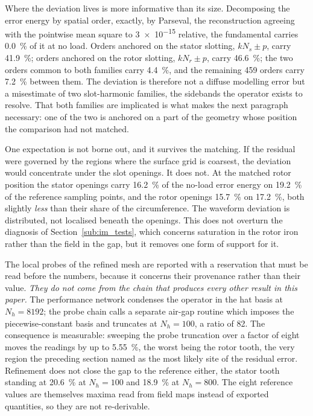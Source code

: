\documentclass[10pt,a4paper,twocolumn]{article}
\theoremstyle{plain}
\theoremstyle{remark}
\begin{document}
Where the deviation lives is more informative than its size. Decomposing
the error energy by spatial order, exactly, by Parseval, the
reconstruction agreeing with the pointwise mean square to \num{3e-15}
relative, the fundamental carries \SI{0.0}{\percent} of it at no load.
Orders anchored on the stator slotting, $kN_s\pm p$, carry
\SI{41.9}{\percent}; orders anchored on the rotor slotting, $kN_r\pm p$,
carry \SI{46.6}{\percent}; the two orders common to both families carry
\SI{4.4}{\percent}, and the remaining \num{459} orders carry
\SI{7.2}{\percent} between them. The deviation is therefore not a
diffuse modelling error but a misestimate of two slot-harmonic
families, the sidebands the operator exists to resolve. That both
families are implicated is what makes the next paragraph necessary: one
of the two is anchored on a part of the geometry whose position the
comparison had not matched.

One expectation is not borne out, and it survives the matching. If the
residual were governed by the regions where the surface grid is
coarsest, the deviation would concentrate under the slot openings. It
does not. At the matched rotor position the stator openings carry
\SI{16.2}{\percent} of the no-load error energy on \SI{19.2}{\percent}
of the reference sampling points, and the rotor openings
\SI{15.7}{\percent} on \SI{17.2}{\percent}, both slightly \emph{less}
than their share of the circumference. The waveform
deviation is distributed, not localised beneath the openings. This does
not overturn the diagnosis of Section~\ref{sub:im_tests}, which concerns
saturation in the rotor iron rather than the field in the gap, but it
removes one form of support for it.


The local probes of the refined mesh are reported with a reservation
that must be read before the numbers, because it concerns their
provenance rather than their value. \emph{They do not come from the
chain that produces every other result in this paper.} The performance
network condenses the operator in the hat basis at $N_h=\num{8192}$; the
probe chain calls a separate air-gap routine which imposes the
piecewise-constant basis and truncates at $N_h=100$, a ratio of 82. The
consequence is measurable: sweeping the probe truncation over a factor
of eight moves the readings by up to \SI{5.55}{\percent}, the worst
being the rotor tooth, the very region the preceding section named as
the most likely site of the residual error. Refinement does not close
the gap to the reference either, the stator tooth standing at
\SI{+20.6}{\percent} at $N_h=100$ and \SI{+18.9}{\percent} at
$N_h=800$. The eight reference values are themselves maxima read from
field maps instead of exported quantities, so they are not
re-derivable.
\end{document}
